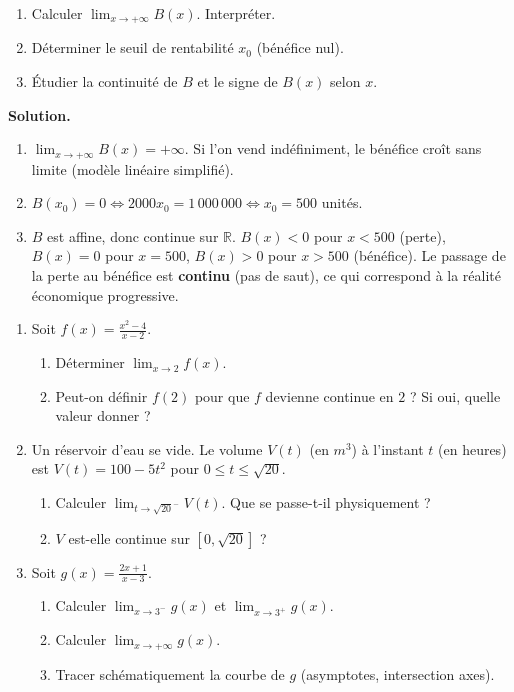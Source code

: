 \documentclass[11pt]{article}
\begin{document}
\begin{exoresolu}
\begin{enumerate}
\item Calculer $\lim_{x \to +\infty} B(x)$. Interpréter.
\item Déterminer le seuil de rentabilité $x_0$ (bénéfice nul).
\item Étudier la continuité de $B$ et le signe de $B(x)$ selon $x$.
\end{enumerate}
\tcblower
\textbf{Solution.}
\begin{enumerate}
\item $\lim_{x \to +\infty} B(x) = +\infty$. Si l'on vend indéfiniment, le bénéfice croît sans limite (modèle linéaire simplifié).
\item $B(x_0) = 0 \iff 2000x_0 = 1\,000\,000 \iff x_0 = 500$ unités.
\item $B$ est affine, donc continue sur $\mathbb{R}$. $B(x) < 0$ pour $x < 500$ (perte), $B(x) = 0$ pour $x=500$, $B(x) > 0$ pour $x > 500$ (bénéfice). Le passage de la perte au bénéfice est \textbf{continu} (pas de saut), ce qui correspond à la réalité économique progressive.
\end{enumerate}
\end{exoresolu}

\begin{exercice}
\begin{enumerate}
\item Soit $f(x) = \frac{x^2 - 4}{x - 2}$.
  \begin{enumerate}
  \item Déterminer $\lim_{x \to 2} f(x)$.
  \item Peut-on définir $f(2)$ pour que $f$ devienne continue en $2$ ? Si oui, quelle valeur donner ?
  \end{enumerate}
\item Un réservoir d'eau se vide. Le volume $V(t)$ (en $m^3$) à l'instant $t$ (en heures) est $V(t) = 100 - 5t^2$ pour $0 \le t \le \sqrt{20}$.
  \begin{enumerate}
  \item Calculer $\lim_{t \to \sqrt{20}^{-}} V(t)$. Que se passe-t-il physiquement ?
  \item $V$ est-elle continue sur $[0, \sqrt{20}]$ ?
  \end{enumerate}
\item Soit $g(x) = \frac{2x+1}{x-3}$.
  \begin{enumerate}
  \item Calculer $\lim_{x \to 3^{-}} g(x)$ et $\lim_{x \to 3^{+}} g(x)$.
  \item Calculer $\lim_{x \to +\infty} g(x)$.
  \item Tracer schématiquement la courbe de $g$ (asymptotes, intersection axes).
  \end{enumerate}
\end{enumerate}
\end{exercice}
\end{document}
